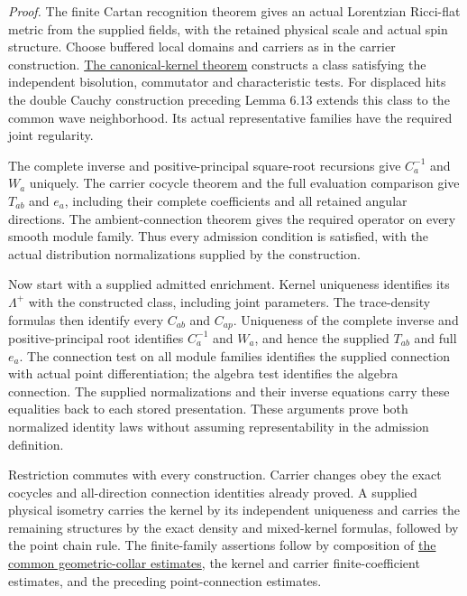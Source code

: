 \documentclass[
  english,
  11pt,
  reqno]{amsart}
\begin{document}
\emph{Proof.} The finite Cartan recognition theorem gives an actual
Lorentzian Ricci-flat metric from the supplied fields, with the retained
physical scale and actual spin structure. Choose buffered local domains
and carriers as in the carrier construction.
\hyperref[thm:online-canonical-wave-kernel]{The canonical-kernel
theorem} constructs a class satisfying the independent bisolution,
commutator and characteristic tests. For displaced hits the double
Cauchy construction preceding Lemma 6.13 extends this class to the
common wave neighborhood. Its actual representative families have the
required joint regularity.

The complete inverse and positive-principal square-root recursions give
\(C_a^{-1}\) and \(W_a\) uniquely. The carrier cocycle theorem and the
full evaluation comparison give \(T_{ab}\) and \(e_a\), including their
complete coefficients and all retained angular directions. The
ambient-connection theorem gives the required operator on every smooth
module family. Thus every admission condition is satisfied, with the
actual distribution normalizations supplied by the construction.

Now start with a supplied admitted enrichment. Kernel uniqueness
identifies its \(\Lambda^+\) with the constructed class, including joint
parameters. The trace-density formulas then identify every \(C_{ab}\)
and \(C_{ap}\). Uniqueness of the complete inverse and
positive-principal root identifies \(C_a^{-1}\) and \(W_a\), and hence
the supplied \(T_{ab}\) and full \(e_a\). The connection test on all
module families identifies the supplied connection with actual point
differentiation; the algebra test identifies the algebra connection. The
supplied normalizations and their inverse equations carry these
equalities back to each stored presentation. These arguments prove both
normalized identity laws without assuming representability in the
admission definition.

Restriction commutes with every construction. Carrier changes obey the
exact cocycles and all-direction connection identities already proved. A
supplied physical isometry carries the kernel by its independent
uniqueness and carries the remaining structures by the exact density and
mixed-kernel formulas, followed by the point chain rule. The
finite-family assertions follow by composition of
\hyperref[thm:online-common-collar-finite-families]{the common
geometric-collar estimates}, the kernel and carrier finite-coefficient
estimates, and the preceding point-connection estimates.
\end{document}
